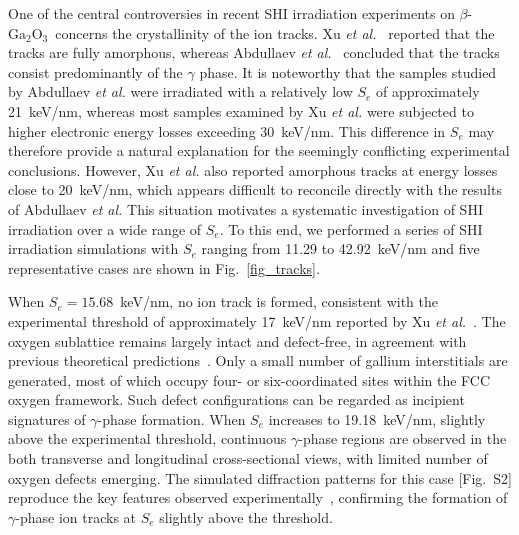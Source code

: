 \documentclass[%
reprint,
superscriptaddress,
 amsmath,amssymb,
 aps,
]{revtex4-2}
\newcommand{\ga}{$\text{Ga}_2\text{O}_3$}
\begin{document}
One of the central controversies in recent SHI irradiation experiments on
$\beta$-\ga\ concerns the crystallinity of the ion tracks.
Xu \textit{et al.}~\cite{xu_thermal_2025} reported that the tracks are fully amorphous,
whereas Abdullaev \textit{et al.}~\cite{abdullaev_ions_2025} concluded that the tracks
consist predominantly of the $\gamma$ phase.
It is noteworthy that the samples studied by Abdullaev \textit{et al.} were irradiated
with a relatively low $S_e$ of approximately 21~keV/nm, whereas most
samples examined by Xu \textit{et al.} were subjected to higher electronic energy losses
exceeding 30~keV/nm.
This difference in $S_e$ may therefore provide a natural explanation
for the seemingly conflicting experimental conclusions.
However, Xu \textit{et al.} also reported amorphous tracks at energy losses close to
20~keV/nm, which appears difficult to reconcile directly with the results of
Abdullaev \textit{et al.}
This situation motivates a systematic investigation of SHI irradiation over a wide
range of $S_e$.
To this end, we performed a series of SHI irradiation simulations with $S_e$ ranging 
from 11.29 to 42.92~keV/nm and 
five representative cases are shown in Fig.~\ref{fig_tracks}.

When $S_e = 15.68$~keV/nm, no ion track is formed, consistent with the experimental
threshold of approximately 17~keV/nm reported by Xu \textit{et al.}~\cite{xu_thermal_2025}.
The oxygen sublattice remains largely intact and defect-free, in agreement with
previous theoretical predictions~\cite{he_ultrahigh_2024}.
Only a small number of gallium interstitials are generated, most of which occupy
four- or six-coordinated sites within the FCC oxygen framework.
Such defect configurations can be regarded as incipient signatures of $\gamma$-phase
formation.
When $S_e$ increases to 19.18~keV/nm, slightly above the experimental threshold, 
continuous $\gamma$-phase regions are observed in the both transverse and longitudinal cross-sectional views, 
with limited number of oxygen defects emerging.
The simulated diffraction patterns for this case [Fig.~S2] reproduce the key features 
observed experimentally~\cite{abdullaev_ions_2025}, confirming the formation of $\gamma$-phase 
ion tracks at $S_e$ slightly above the threshold. 
\end{document}
